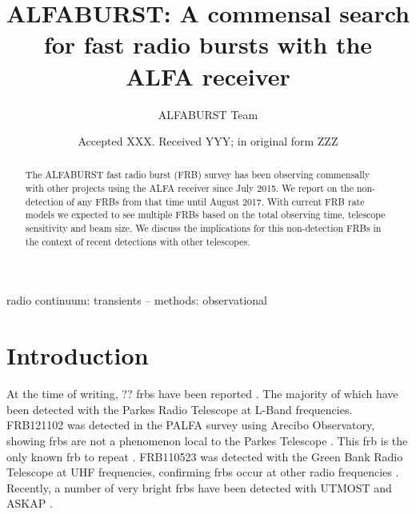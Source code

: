 \documentclass[a4paper,fleqn,usenatbib]{mnras}
\title[The ALFABURST Commensal FRB Survey]{ALFABURST: A commensal search for
fast radio bursts with the ALFA receiver}
\author[ALFABURST Team]{
ALFABURST Team
}
\date{Accepted XXX. Received YYY; in original form ZZZ}
\begin{document}
\label{firstpage}
\pagerange{\pageref{firstpage}--\pageref{lastpage}}
\maketitle

\begin{abstract}
The ALFABURST fast radio burst (FRB) survey has been observing commensally with
other projects using the ALFA receiver since July 2015. We report on the
non-detection of any FRBs from that time until August 2017. With current FRB rate
models we expected to see multiple FRBs based on the total observing time,
telescope sensitivity and beam size. We discuss the implications for this
non-detection FRBs in the context of recent detections with other telescopes.
\end{abstract}

\begin{keywords}
radio continuum: transients -- methods: observational
\end{keywords}


\section{Introduction}
\label{sec:intro}

At the time of writing, ?? \glspl{frb} have been reported
\citep[for an up-to-date list, see][]{2016PASA...33...45P}. The majority of which have been detected with the
Parkes Radio Telescope at L-Band frequencies. FRB121102 was detected in the
PALFA survey using Arecibo Observatory, showing \glspl{frb} are not a phenomenon
local to the Parkes Telescope \citep{2014ApJ...790..101S}. This \gls{frb} is the
only known \gls{frb} to repeat \citep{2016ApJ...833..177S}.  FRB110523 was
detected with the Green Bank Radio Telescope at UHF frequencies, confirming
\glspl{frb} occur at other radio frequencies \citep{2015Natur.528..523M}.
Recently, a number of very bright \glspl{frb} have been detected with UTMOST
\citep{2017MNRAS.468.3746C,atel10697} and ASKAP \citep{2017ApJ...841L..12B}.
\end{document}
